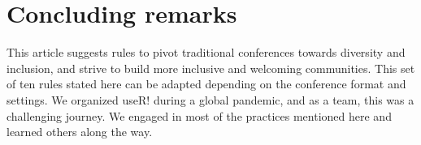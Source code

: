 \documentclass[10pt,letterpaper]{article}
\begin{document}


\section*{Concluding remarks}

This article suggests rules to pivot traditional conferences towards diversity and inclusion, and strive to build more inclusive and welcoming communities. 
This set of ten rules stated here can be adapted depending on the conference format and settings.
We organized useR! during a global pandemic, and as a team, this was a challenging journey. 
We engaged in most of the practices mentioned here and learned others along the way. 
\end{document}

